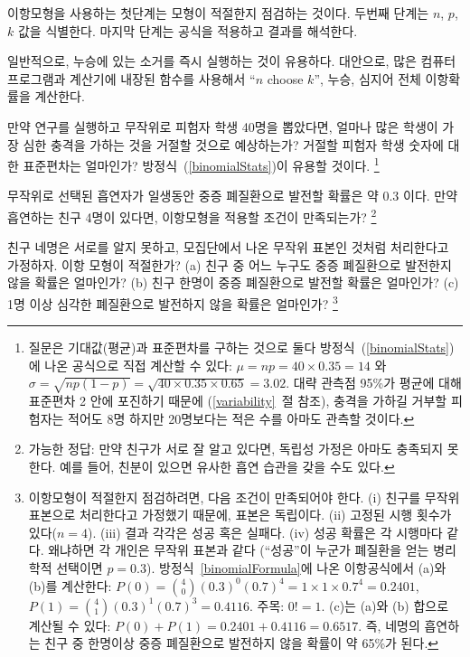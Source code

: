 \begin{tipBox}{
이항모형을 사용하는 첫단계는 모형이 적절한지 점검하는 것이다. 두번째 단계는 $n$, $p$, $k$ 값을 식별한다. 마지막 단계는 공식을 적용하고 결과를 해석한다.}
\end{tipBox}

\begin{tipBox}{
일반적으로, 누승에 있는 소거를 즉시 실행하는 것이 유용하다. 대안으로, 많은 컴퓨터 프로그램과 계산기에 내장된 함수를 사용해서 ``$n$ choose $k$'', 누승, 심지어 전체 이항확률을 계산한다.}
\end{tipBox}

\begin{exercise}
만약 연구를 실행하고 무작위로 피험자 학생 40명을 뽑았다면, 얼마나 많은 학생이 가장 심한 충격을 가하는 것을 거절할 것으로 예상하는가? 거절할 피험자 학생 숫자에 대한 표준편차는 얼마인가? 방정식~(\ref{binomialStats})이 유용할 것이다. 
\footnote{질문은 기대값(평균)과 표준편차를 구하는 것으로 둘다 방정식~(\ref{binomialStats})에 나온 공식으로 직접 계산할 수 있다: $\mu=np = 40\times 0.35 = 14$ 와 $\sigma = \sqrt{np(1-p)} = \sqrt{40\times 0.35\times 0.65} = 3.02$. 
대략 관측점 95\%가 평균에 대해 표준편차 2 안에 포진하기 때문에 (\ref{variability}~절 참조), 충격을 가하길 거부할 피험자는 적어도 8명 하지만 20명보다는 적은 수를 아마도 관측할 것이다.}
\end{exercise}

\begin{exercise}
무작위로 선택된 흡연자가 일생동안 중증 폐질환으로 발전할 확률은 약 0.3 이다. 만약 흡연하는 친구 4명이 있다면, 이항모형을 적용할 조건이 만족되는가? \footnote{가능한 정답: 만약 친구가 서로 잘 알고 있다면, 독립성 가정은 아마도 충족되지 못한다. 예를 들어, 친분이 있으면 유사한 흡연 습관을 갖을 수도 있다.}
\end{exercise}

\begin{exercise}
\label{noMoreThanOneFriendWSevereLungCondition}%
친구 네명은 서로를 알지 못하고, 모집단에서 나온 무작위 표본인 것처럼 처리한다고 가정하자. 이항 모형이 적절한가? (a) 친구 중 어느 누구도 중증 폐질환으로 발전한지 않을 확률은 얼마인가? (b) 친구 한명이 중증 폐질환으로 발전할 확률은 얼마인가? (c) 1명 이상 심각한 폐질환으로 발전하지 않을 확률은 얼마인가?
\footnote{이항모형이 적절한지 점검하려면, 다음 조건이 만족되어야 한다. (i) 친구를 무작위 표본으로 처리한다고 가정했기 때문에, 표본은 독립이다. (ii) 고정된 시행 횟수가 있다($n=4$). (iii) 결과 각각은 성공 혹은 실패다. (iv) 성공 확률은 각 시행마다 같다. 왜냐하면 각 개인은 무작위 표본과 같다 (``성공''이 누군가 폐질환을 얻는 병리학적 선택이면 $p=0.3$). 방정식~\eqref{binomialFormula}에 나온 이항공식에서 (a)와 (b)를 계산한다: $P(0) =  {4 \choose 0} (0.3)^0 (0.7)^4 = 1\times1\times0.7^4 = 0.2401$, $P(1) = {4 \choose 1} (0.3)^1(0.7)^{3} = 0.4116$. 주목: $0!=1$. (c)는 (a)와 (b) 합으로 계산될 수 있다: $P(0) + P(1) = 0.2401 + 0.4116 = 0.6517$. 즉, 네명의 흡연하는 친구 중 한명이상 중증 폐질환으로 발전하지 않을 확률이 약 65\%가 된다.}
\end{exercise}

